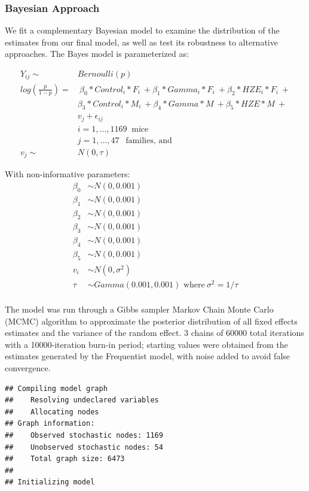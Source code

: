 \documentclass[
]{article}
\begin{document}
\hypertarget{bayesian-approach}{%
\subsubsection{Bayesian Approach}\label{bayesian-approach}}

We fit a complementary Bayesian model to examine the distribution of the
estimates from our final model, as well as test its robustness to
alternative approaches. The Bayes model is parameterized as:

\[
\begin{aligned}
Y_{ij} \sim &Bernoulli(p)\\
log(\frac{p}{1-p}) = &\ \beta_0*Control_i*F_i\ +\beta_1*Gamma_i*F_i\ + \beta_2*HZE_i*F_i\ + \\ &\beta_3*Control_i*M_i\ +\beta_4*Gamma*M\ + \beta_5*HZE*M\ + \\
&v_{j} + \epsilon_{ij}\\
&i = 1, ..., 1169\ \mbox{ mice} \\
&j = 1,...,47\ \ \mbox{ families, and} \\
v_j \sim\ &N(0, \tau)
\end{aligned}
\]

With non-informative parameters:\\
\[
\begin{aligned}
\beta_0 &\sim N(0, 0.001)\\
\beta_1 &\sim N(0, 0.001)\\
\beta_2 &\sim N(0, 0.001)\\
\beta_3 &\sim N(0, 0.001)\\
\beta_4 &\sim N(0, 0.001)\\
\beta_5 &\sim N(0, 0.001)\\
v_i &\sim N(0, \sigma^2)\\
\tau &\sim Gamma(0.001, 0.001) \mbox{ where}\ \sigma^2 = 1/\tau\\
\end{aligned}
\]

The model was run through a Gibbs sampler Markov Chain Monte Carlo
(MCMC) algorithm to approximate the posterior distribution of all fixed
effects estimates and the variance of the random effect. 3 chains of
60000 total iterations with a 10000-iteration burn-in period; starting
values were obtained from the estimates generated by the Frequentist
model, with noise added to avoid false convergence.

\begin{verbatim}
## Compiling model graph
##    Resolving undeclared variables
##    Allocating nodes
## Graph information:
##    Observed stochastic nodes: 1169
##    Unobserved stochastic nodes: 54
##    Total graph size: 6473
## 
## Initializing model
\end{verbatim}
\end{document}
